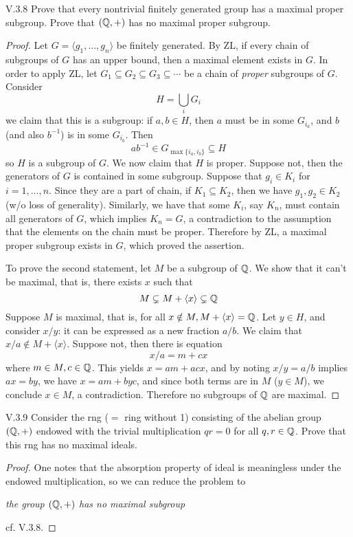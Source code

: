 \begin{problem}{V.3.8}
Prove that every nontrivial finitely generated group has a maximal proper subgroup. Prove that $(\mathbb{Q},+)$ has no maximal proper subgroup.
\end{problem}
\begin{proof}
Let $G = \langle g_1,\dotsc,g_n \rangle$ be finitely generated. By ZL, if every chain of subgroups of $G$ has an upper bound, then a maximal element exists in $G$. In order to apply ZL, let $G_1 \subseteq G_2 \subseteq G_3 \subseteq \cdots$ be a chain of \emph{proper} subgroups of $G$. Consider
\[
H = \bigcup_{i}G_i
\]
we claim that this is a subgroup: if $a,b \in H$, then $a$ must be in some $G_{i_a}$, and $b$ (and also $b^{-1}$) is in some $G_{i_b}$. Then
\[
ab^{-1} \in G_{\max\{i_a,i_b\}} \subseteq H
\]
so $H$ is a subgroup of $G$. We now claim that $H$ is proper. Suppose not, then the generators of $G$ is contained in some subgroup. Suppose that $g_i \in K_i$ for $i = 1,\dotsc,n$. Since they are a part of chain, if $K_1 \subseteq K_2$, then we have $g_1,g_2 \in K_2$(w/o loss of generality). Similarly, we have that some $K_i$, say $K_n$, must contain all generators of $G$, which implies $K_n = G$, a contradiction to the assumption that the elements on the chain must be proper. Therefore by ZL, a maximal proper subgroup exists in $G$, which proved the assertion.

To prove the second statement, let $M$ be a subgroup of $\mathbb{Q}$. We show that it can't be maximal, that is, there exists $x$ such that 
\[
M \subsetneq M + \langle x \rangle \subsetneq \mathbb{Q}
\]
Suppose $M$ is maximal, that is, for all $x \notin M, M+ \langle x \rangle = \mathbb{Q}$. Let $y \in H$, and consider $x/y$: it can be expressed as a new fraction $a/b$. We claim that $x/a \notin M+ \langle x \rangle$. Suppose not, then there is equation
\[
x/a = m + cx
\]
where $m \in M, c \in \mathbb{Q}$. This yields $x = am + acx$, and by noting $x/y = a/b$ implies $ax = by$, we have $x = am+byc$, and since both terms are in $M$ ($y \in M$), we conclude $x \in M$, a contradiction. Therefore no subgroups of $\mathbb{Q}$ are maximal.
\end{proof}

\begin{problem}{V.3.9}
Consider the rng ($=$ ring without 1) consisting of the abelian group $(\mathbb{Q},+)$ endowed with the trivial multiplication $qr=0$ for all $q,r \in \mathbb{Q}$. Prove that this rng has no maximal ideals.
\end{problem}
\begin{proof}
One notes that the absorption property of ideal is meaningless under the endowed multiplication, so we can reduce the problem to
\begin{center}
\emph{the group $(\mathbb{Q},+)$ has no maximal subgroup}
\end{center}
cf. V.3.8.

\end{proof}

